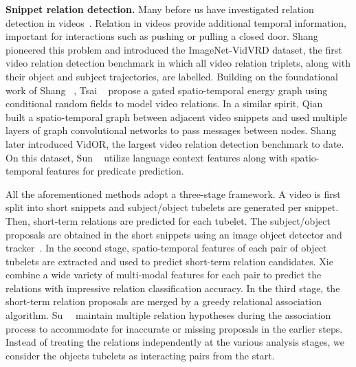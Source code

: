 \documentclass[10pt,twocolumn,letterpaper]{article}
\begin{document}
\textbf{Snippet relation detection.}
Many before us have investigated relation detection in videos~\cite{shang2017video,tsai2019video,qian2019video,di2019multiple,sun2019video,zheng2019relation,shang2019annotating,liu2020beyond, cao2021relation,xie2020video,su2020video,Kukleva_2020_CVPR,Sunkesula_mm_2020}. Relation in videos provide additional temporal information, important for interactions such as pushing or pulling a closed door. Shang \etal~\cite{shang2017video} pioneered this problem and introduced the ImageNet-VidVRD dataset, the first video relation detection benchmark in which all video relation triplets, along with their object and subject trajectories, are labelled. Building on the foundational work of Shang \etal~\cite{shang2017video}, Tsai \etal~\cite{tsai2019video} propose a gated spatio-temporal energy graph using conditional random fields to model video relations. In a similar spirit, Qian \etal~\cite{qian2019video} built a spatio-temporal graph between adjacent video snippets and used multiple layers of graph convolutional networks to pass messages between nodes. Shang \etal~\cite{shang2019annotating} later introduced VidOR, the largest video relation detection benchmark to date. On this dataset, Sun \etal~\cite{sun2019video} utilize language context features along with spatio-temporal features for predicate prediction.

All the aforementioned methods adopt a three-stage framework. A video is first split into short snippets and subject/object tubelets are generated per snippet. Then, short-term relations are predicted for each tubelet. The subject/object proposals are obtained in the short snippets using an image object detector and tracker~\cite{shang2017video, tsai2019video, qian2019video}.
In the second stage, spatio-temporal features of each pair of object tubelets are extracted and used to predict short-term relation candidates. Xie~\etal~\cite{xie2020video} combine a wide variety of multi-modal features for each pair to predict the relations with impressive relation classification accuracy. In the third stage, the short-term relation proposals are merged by a greedy relational association algorithm. Su~\etal~\cite{su2020video} maintain multiple relation hypotheses during the association process to accommodate for inaccurate or missing proposals in the earlier steps. Instead of treating the relations independently at the various analysis stages, we consider the objects tubelets as interacting pairs from the start.
\end{document}
